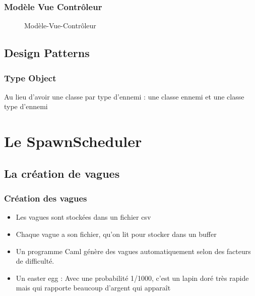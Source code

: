 \documentclass[pdf]{beamer}
\begin{document}
\begin{frame}
  \frametitle{Mod\`ele Vue Contr\^oleur}
  \begin{figure}[h]
    \centering
    \caption{Modèle-Vue-Contrôleur}
  \end{figure}
\end{frame}

\subsection{Design Patterns}

\begin{frame}
  \frametitle{Type Object}
  Au lieu d'avoir une classe par type d'ennemi : une classe ennemi et une classe
  type d'ennemi
\end{frame}

\section{Le SpawnScheduler}

\subsection{La création de vagues}
\begin{frame}
    \frametitle{Création des vagues}
    \begin{itemize}
        \item Les vagues sont stockées dans un fichier csv
        \item Chaque vague a son fichier, qu'on lit pour stocker dans un buffer
        \item Un programme Caml génère des vagues automatiquement selon des
            facteurs de difficulté.
        \item Un easter egg : Avec une probabilité 1/1000, c'est un lapin doré
            très rapide mais qui rapporte beaucoup d'argent qui apparaît
    \end{itemize}
\end{frame}
\end{document}
